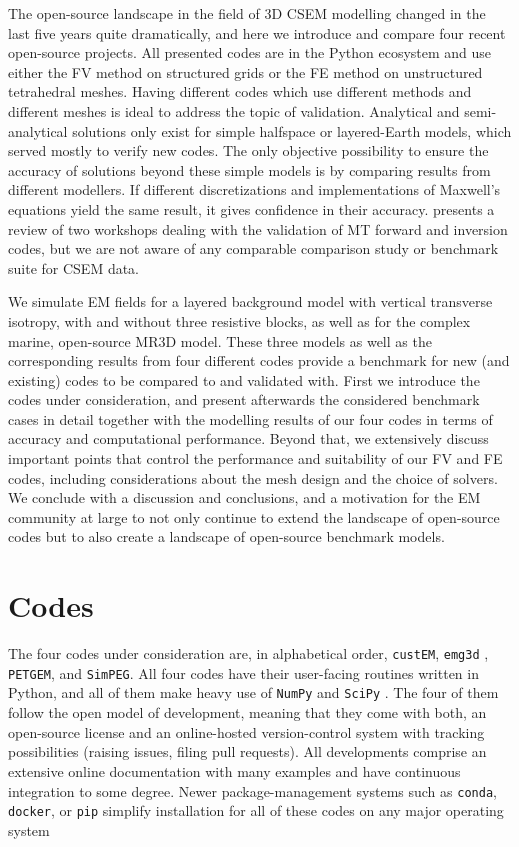 \documentclass[onecolumn,extra,camera]{gji}
\newcommand{\emg}[2]{\texttt{emg#1#2}\xspace}
\newcommand{\simpeg}{\texttt{SimPEG}\xspace}
\newcommand{\custem}{\texttt{custEM}\xspace}
\newcommand{\petgem}{\texttt{PETGEM}\xspace}
\begin{document}
The open-source landscape in the field of 3D CSEM modelling changed in the last five years quite dramatically, and here we introduce and compare four recent open-source projects. All presented codes are in the Python ecosystem and use either the FV method on structured grids or the FE method on unstructured tetrahedral meshes. Having different codes which use different methods and different meshes is ideal to address the topic of validation. Analytical and semi-analytical solutions only exist for simple halfspace or layered-Earth models, which served mostly to verify new codes. The only objective possibility to ensure the accuracy of solutions beyond these simple models is by comparing results from different modellers. If different discretizations and implementations of Maxwell's equations yield the same result, it gives confidence in their accuracy. \cite{GJI.13.Miensopust} presents a review of two workshops dealing with the validation of MT forward and inversion codes, but we are not aware of any comparable comparison study or benchmark suite for CSEM data.

We simulate EM fields for a layered background model with vertical transverse isotropy, with and without three resistive blocks, as well as for the complex marine, open-source MR3D model. These three models as well as the corresponding results from four different codes provide a benchmark for new (and existing) codes to be compared to and validated with. First we introduce the codes under consideration, and present afterwards the considered benchmark cases in detail together with the modelling results of our four codes in terms of accuracy and computational performance. Beyond that, we extensively discuss important points that control the performance and suitability of our FV and FE codes, including considerations about the mesh design and the choice of solvers. We conclude with a discussion and conclusions, and a motivation for the EM community at large to not only continue to extend the landscape of open-source codes but to also create a landscape of open-source benchmark models.

\section{Codes}

The four codes under consideration are, in alphabetical order, \custem \citep{GEO.19.Rochlitz}, \emg3d \citep{JOSS.19.Werthmuller}, \petgem \citep{CAG.18.CastilloReyes, GJI.19.CastilloReyes}, and \simpeg \citep{CAG.15.Cockett, CAG.17.Heagy}. All four codes have their user-facing routines written in Python, and all of them make heavy use of \texttt{NumPy} \citep{NAT.20.Harris} and \texttt{SciPy} \citep{NM.20.Virtanen}. The four of them follow the open model of development, meaning that they come with both, an open-source license and an online-hosted version-control system with tracking possibilities (raising issues, filing pull requests). All developments comprise an extensive online documentation with many examples and have continuous integration to some degree. Newer package-management systems such as \texttt{conda}, \texttt{docker}, or \texttt{pip} simplify installation for all of these codes on any major operating system
\end{document}
